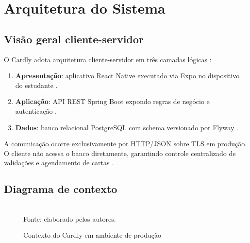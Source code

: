 \chapter{Arquitetura do Sistema}
\label{cap:arquitetura}

\section{Visão geral cliente-servidor}

O Cardly adota arquitetura cliente-servidor em três camadas lógicas \cite{tanenbaum2015,sommerville2019}:
\begin{enumerate}
    \item \textbf{Apresentação}: aplicativo React Native executado via Expo no dispositivo do estudante \cite{react_native_docs,expo_docs}.
    \item \textbf{Aplicação}: API REST Spring Boot expondo regras de negócio e autenticação \cite{spring_boot_docs,rest_fielding}.
    \item \textbf{Dados}: banco relacional PostgreSQL com schema versionado por Flyway \cite{postgresql_docs,flyway_docs}.
\end{enumerate}

A comunicação ocorre exclusivamente por HTTP/JSON sobre TLS em produção. O cliente não acessa o banco diretamente, garantindo controle centralizado de validações e agendamento de cartas \cite{clean_architecture_martin}.

\section{Diagrama de contexto}

\begin{figure}[htbp]
    \centering
    \caption{Contexto do Cardly em ambiente de produção}
    \label{fig:contexto}
    \\[0.3em]
    \footnotesize Fonte: elaborado pelos autores.
\end{figure}

